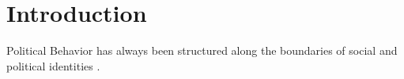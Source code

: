 \section{Introduction}


Political Behavior has always been structured along the boundaries of social and political identities \parencite{eganIdentityDependentVariable2020, masonUncivilAgreementHow2018, kaneWhoPartyGroup2021, jeffersonSeeingBlueBlack2021}. 